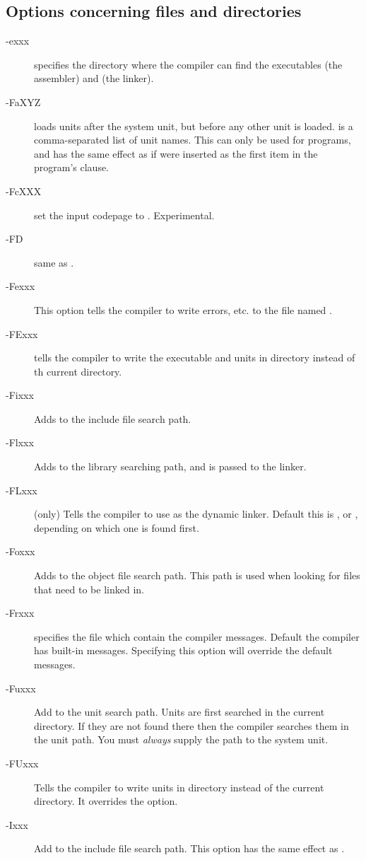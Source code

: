 %
%
\subsection{Options concerning files and directories}
\begin{description}
\item [-exxx]  specifies the directory where the
compiler can find the executables  (the assembler) and 
(the linker).
\item[-FaXYZ] loads units  after the system unit, but before any other 
unit is loaded.  is a comma-separated list of unit names. This can only be used
for programs, and has the same effect as if  were inserted as the
first item in the program's  clause.
\item[-FcXXX] set the input codepage to . Experimental.
\item [-FD] same as .
\item [-Fexxx] This option tells the compiler to write errors, etc. to
the file named .
\item [-FExxx] tells the compiler to write the executable and units in
directory  instead of th current directory.
\item [-Fixxx] Adds  to the include file search path.
\item [-Flxxx] Adds  to the library searching path, and is passed
to the linker.
\item[-FLxxx] (\linux only) Tells the compiler to use  as the
dynamic linker. Default this is , or
, depending on which one is found first.
\item[-Foxxx] Adds  to the object file search path.
This path is used when looking for files that need to be linked in.
\item [-Frxxx]  specifies the file which contain the compiler
messages. Default the compiler has built-in messages. Specifying this option
will override the default messages.
\item [-Fuxxx] Add  to the unit search path.
Units are first searched in the current directory.
If they are not found there then the compiler searches them in the unit path.
You must {\em always} supply the path to the system unit.
\item [-FUxxx] Tells the compiler to write units in directory 
instead of the current directory. It overrides the  option.
\item [-Ixxx]  Add  to the include file search path.
This option has the same effect as .
\end{description}

